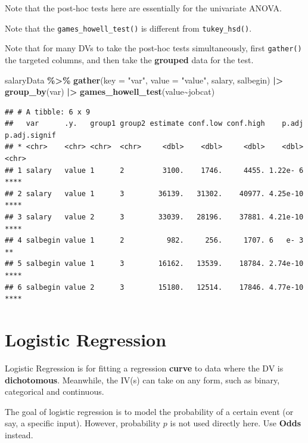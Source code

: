 \documentclass[
]{ctexart}
\newenvironment{Shaded}{\begin{snugshade}}{\end{snugshade}}
\newcommand{\AttributeTok}[1]{\textcolor[rgb]{0.13,0.29,0.53}{#1}}
\newcommand{\FunctionTok}[1]{\textcolor[rgb]{0.13,0.29,0.53}{\textbf{#1}}}
\newcommand{\NormalTok}[1]{#1}
\newcommand{\SpecialCharTok}[1]{\textcolor[rgb]{0.81,0.36,0.00}{\textbf{#1}}}
\newcommand{\StringTok}[1]{\textcolor[rgb]{0.31,0.60,0.02}{#1}}
\begin{document}
Note that the post-hoc tests here are essentially for the univariate
ANOVA.

Note that the \texttt{games\_howell\_test()} is different from
\texttt{tukey\_hsd()}.

Note that for many DVs to take the post-hoc tests simultaneously, first
\texttt{gather()} the targeted columns, and then take the
\textbf{grouped} data for the test.

\begin{Shaded}
\begin{Highlighting}[]
\NormalTok{salaryData }\SpecialCharTok{\%\textgreater{}\%} \FunctionTok{gather}\NormalTok{(}\AttributeTok{key =} \StringTok{"var"}\NormalTok{, }
                      \AttributeTok{value =} \StringTok{"value"}\NormalTok{, }
\NormalTok{                      salary, salbegin) }\SpecialCharTok{|\textgreater{}} 
  \FunctionTok{group\_by}\NormalTok{(var) }\SpecialCharTok{|\textgreater{}}
  \FunctionTok{games\_howell\_test}\NormalTok{(value}\SpecialCharTok{\textasciitilde{}}\NormalTok{jobcat) }
\end{Highlighting}
\end{Shaded}

\begin{verbatim}
## # A tibble: 6 x 9
##   var      .y.   group1 group2 estimate conf.low conf.high    p.adj p.adj.signif
## * <chr>    <chr> <chr>  <chr>     <dbl>    <dbl>     <dbl>    <dbl> <chr>       
## 1 salary   value 1      2         3100.    1746.     4455. 1.22e- 6 ****        
## 2 salary   value 1      3        36139.   31302.    40977. 4.25e-10 ****        
## 3 salary   value 2      3        33039.   28196.    37881. 4.21e-10 ****        
## 4 salbegin value 1      2          982.     256.     1707. 6   e- 3 **          
## 5 salbegin value 1      3        16162.   13539.    18784. 2.74e-10 ****        
## 6 salbegin value 2      3        15180.   12514.    17846. 4.77e-10 ****
\end{verbatim}

\hypertarget{logistic-regression}{%
\section{Logistic Regression}\label{logistic-regression}}

Logistic Regression is for fitting a regression \textbf{curve} to data
where the DV is \textbf{dichotomous}. Meanwhile, the IV(s) can take on
any form, such as binary, categorical and continuous.

The goal of logistic regression is to model the probability of a certain
event (or say, a specific input). However, probability \(p\) is not used
directly here. Use \textbf{Odds} instead.
\end{document}
